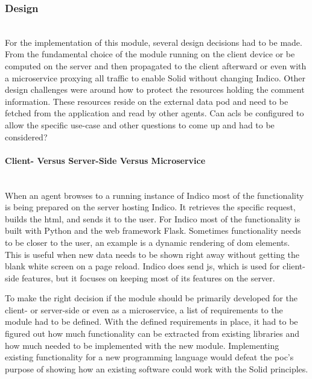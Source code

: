 \subsubsection{Design}\label{subsubsection:design}\mbox{}\\

For the implementation of this module, several design decisions had to be made. From the fundamental choice of the module running on the client device or be computed on the server and then propagated to the client afterward or even with a microservice proxying all traffic to enable Solid without changing Indico.
Other design challenges were around how to protect the resources holding the comment information. These resources reside on the external data pod and need to be fetched from the application and read by other agents. Can \glspl{acl} be configured to allow the specific use-case and other questions to come up and had to be considered?
\vspace{0.5cm}
\paragraph{Client- Versus Server-Side Versus Microservice}\mbox{}\\

When an agent browses to a running instance of Indico most of the functionality is being prepared on the server hosting Indico. It retrieves the specific request, builds the \gls{html}, and sends it to the user. For Indico most of the functionality is built with Python and the web framework Flask. Sometimes functionality needs to be closer to the user, an example is a dynamic rendering of \gls{dom} elements. This is useful when new data needs to be shown right away without getting the blank white screen on a page reload.
Indico does send \gls{js}, which is used for client-side features, but it focuses on keeping most of its features on the server.

To make the right decision if the module should be primarily developed for the client- or server-side or even as a microservice, a list of requirements to the module had to be defined. With the defined requirements in place, it had to be figured out how much functionality can be extracted from existing libraries and how much needed to be implemented with the new module. Implementing existing functionality for a new programming language would defeat the \gls{poc}’s purpose of showing how an existing software could work with the Solid principles.

